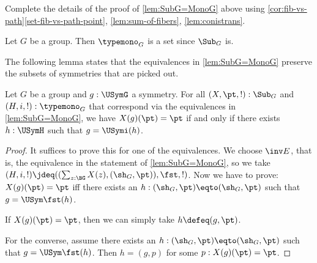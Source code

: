 \begin{xca}\label{xca:SubG=MonoG}
Complete the details of the proof of \cref{lem:SubG=MonoG} above using 
\cref{cor:fib-vs-path}\ref{set-fib-vs-path-point},
\cref{lem:sum-of-fibers},
\cref{lem:conistrans}.
\end{xca}

\begin{corollary}\label{lem:setofsubgroups}
Let $G$ be a group. Then $\typemono_G$ is a set since $\Sub_G$ is.
\end{corollary}

The following lemma states that the equivalences in \cref{lem:SubG=MonoG} preserve the subsets of symmetries that are picked out.
\begin{lemma}\label{lem:E-preserves-symms}
  Let $G$ be a group and $g:\USymG$ a symmetry.
  For all $(X,\pt,!) : \Sub_G$ and $(H,i,!) : \typemono_G$
  that correspond via the equivalences in \cref{lem:SubG=MonoG},
  we have $X(g)(\pt) = \pt$ if and only if there exists $h:\USymH$
  such that $g = \USymi(h)$.
\end{lemma}
\begin{proof}
It suffices to prove this for one of the equivalences.
We choose $\inv E$, that is, the equivalence in the statement
of \cref{lem:SubG=MonoG}, so we take 
$(H,i,!) \jdeq ((\sum_{z:\BG}X(z),(\sh_G,\pt)),\fst,!)$.
Now we have to prove: $X(g)(\pt)=\pt$ iff there exists an
$h:(\sh_G,\pt)\eqto(\sh_G,\pt)$ such that $g = \USym\fst(h)$.

If $X(g)(\pt)=\pt$, then we can simply take $h\defeq(g,\pt)$.

For the converse, assume there exists an
$h:(\sh_G,\pt)\eqto(\sh_G,\pt)$ such that $g = \USym\fst(h)$.
Then $h = (g,p)$ for some $p: X(g)(\pt)=\pt$.
\end{proof}

%


